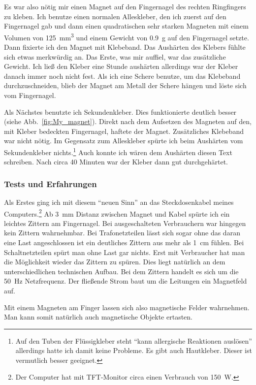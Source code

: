 Es war also nötig mir einen Magnet auf den Fingernagel des rechten Ringfingers zu kleben. Ich
benutze einen normalen Alleskleber, den ich zuerst auf den Fingernagel gab und dann einen
quadratischen sehr starken Magneten mit einem Volumen von \SI{125}{\cubic\milli\metre}
und einem Gewicht von \SI{0,9}{\gram} auf den
Fingernagel setzte. Dann fixierte ich den Magnet mit Klebeband. Das Aushärten des Klebers fühlte
sich etwas merkwürdig an. Das Erste, was mir auffiel, war das zusätzliche Gewicht. Ich ließ den
Kleber eine Stunde aushärten allerdings war der Kleber danach immer noch nicht fest. Als ich eine
Schere benutze, um das Klebeband durchzuschneiden, blieb der Magnet am Metall der Schere hängen und
löste sich vom Fingernagel.

Als Nächstes benutzte ich Sekundenkleber. Dies funktionierte deutlich besser
(siehe Abb.~\vref{fig:My_magnet}).
Direkt nach dem
Aufsetzen des Magneten auf den, mit Kleber bedeckten Fingernagel, haftete der Magnet.
Zusätzliches Klebeband war nicht nötig. Im Gegensatz zum Alleskleber spürte ich beim Aushärten vom
Sekundenkleber nichts.\footnote{Auf den Tuben der Flüssigkleber steht \enquote{kann
allergische Reaktionen auslösen} allerdings hatte ich damit keine Probleme. Es gibt
auch Hautkleber. Dieser ist vermutlich besser geeignet.} Auch konnte ich wären dem Aushärten
diesen Text schreiben. Nach circa 40 Minuten war der Kleber dann gut durchgehärtet.

\subsubsection{Tests und Erfahrungen}
Als Erstes ging ich mit diesem \enquote{neuen Sinn} an das Steckdosenkabel meines
Computers.\footnote{Der Computer hat mit TFT-Monitor circa einen Verbrauch von \SI{150}{\watt}.} Ab
\SI{3}{\milli\metre} Distanz zwischen Magnet und Kabel spürte ich ein leichtes Zittern am
Fingernagel. Bei ausgeschalteten Verbrauchern war hingegen kein Zittern wahrnehmbar. Bei
Trafonetzteilen lässt sich sogar ohne das daran eine Last angeschlossen ist ein deutliches Zittern
aus mehr als \SI{1}{\centi\metre} fühlen. Bei Schaltnetzteilen spürt man ohne Last gar nichts. Erst
mit Verbraucher hat man die Möglichkeit wieder das Zittern zu spüren. Dies liegt natürlich an dem
unterschiedlichen technischen Aufbau. Bei dem Zittern handelt es sich um die \SI{50}{\hertz}
Netzfrequenz. Der fließende Strom baut um die Leitungen ein Magnetfeld auf.

Mit einem Magneten am Finger lassen sich also magnetische Felder wahrnehmen. Man kann somit natürlich
auch magnetische Objekte ertasten.

